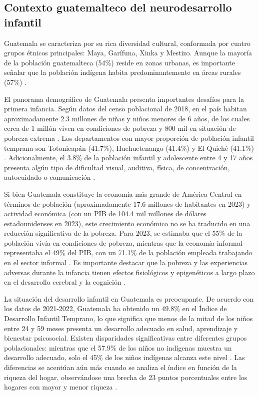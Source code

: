 \subsection{Contexto guatemalteco del neurodesarrollo infantil}
Guatemala se caracteriza por su rica diversidad cultural, conformada por 
cuatro grupos étnicos principales: Maya, Garífuna, Xinka y Mestizo. Aunque la 
mayoría de la población guatemalteca (54\%) reside en zonas urbanas, es 
importante señalar que la población indígena habita predominantemente en áreas 
rurales (57\%) \cite{PoliticaInfanciaGuate}.

El panorama demográfico de Guatemala presenta importantes desafíos para la 
primera infancia. Según datos del censo poblacional de 2018, en el país 
habitan aproximadamente 2.3 millones de niñas y niños menores de 6 años, de 
los cuales cerca de 1 millón viven en condiciones de pobreza y 800 mil en 
situación de pobreza extrema \cite{INE}. Los departamentos con mayor proporción 
de población infantil temprana son Totonicapán (41.7\%), Huehuetenango (41.4\%) 
y El Quiché (41.1\%) \cite{UNICEFAtlas}. Adicionalmente, el 3.8\% de la 
población infantil y adolescente entre 4 y 17 años presenta algún tipo de 
dificultad visual, auditiva, física, de concentración, autocuidado o 
comunicación \cite{INE}.

Si bien Guatemala constituye la economía más grande de América Central en
términos de población (aproximadamente 17.6 millones de habitantes en 2023) y
actividad económica (con un PIB de 104.4 mil millones de dólares
estadounidenses en 2023), este crecimiento económico no se ha traducido en una
reducción significativa de la pobreza. Para 2023, se estimaba que el 55\% de la
población vivía en condiciones de pobreza, mientras que la economía informal
representaba el 49\% del PIB, con un 71.1\% de la población empleada trabajando
en el sector informal \cite{WorldBankGuate}. Es importante destacar que la
pobreza y las experiencias adversas durante la infancia tienen efectos
fisiológicos y epigenéticos a largo plazo en el desarrollo cerebral y la
cognición \cite{Luby_2015, Noble_2015}.

La situación del desarrollo infantil en Guatemala es preocupante. De acuerdo
con los datos de 2021-2022, Guatemala ha obtenido un 49.8\% en el Índice de
Desarrollo Infantil Temprano, lo que significa que menos de la mitad de los
niños entre 24 y 59 meses presenta un desarrollo adecuado en salud, aprendizaje
y bienestar psicosocial. Existen disparidades significativas entre diferentes
grupos poblacionales: mientras que el 57.9\% de los niños no indígenas muestra
un desarrollo adecuado, solo el 45\% de los niños indígenas alcanza este nivel
\cite{SESAN2022}. Las diferencias se acentúan aún más cuando se analiza el
índice en función de la riqueza del hogar, observándose una brecha de 23 puntos
porcentuales entre los hogares con mayor y menor riqueza \cite{UNICEFGuate}.

